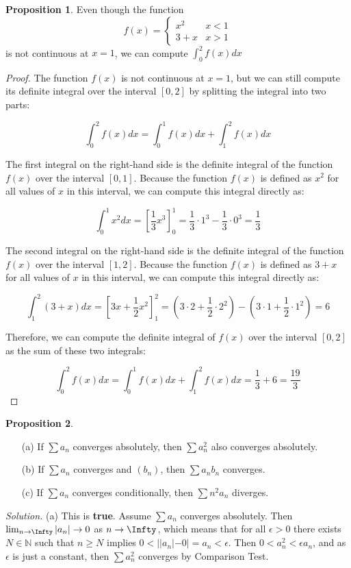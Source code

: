 \documentclass[oneside]{amsart}
\theoremstyle{definition}
\newtheorem{prop}{Proposition}[section]
\newcommand{\nn}{\mathbb N}
\begin{document}
\begin{prop}
Even though the function $$ f(x) = \begin{cases}
	x^2 & x<1 \\
	3+x & x>1
\end{cases}$$	is not continuous at $x =1$, we can compute $\int_0^2 f(x)dx$
\end{prop}
\begin{proof} 
	The function $f(x)$ is not continuous at $x=1$, but we can still compute its definite integral over the interval $[0,2]$ by splitting the integral into two parts:

$$\int_0^2 f(x) dx = \int_0^1 f(x) dx + \int_1^2 f(x) dx$$

The first integral on the right-hand side is the definite integral of the function $f(x)$ over the interval $[0,1]$. Because the function $f(x)$ is defined as $x^2$ for all values of $x$ in this interval, we can compute this integral directly as:

$$\int_0^1 x^2 dx = \left[\frac{1}{3} x^3\right]_0^1 = \frac{1}{3} \cdot 1^3 - \frac{1}{3} \cdot 0^3 = \frac{1}{3}$$

The second integral on the right-hand side is the definite integral of the function $f(x)$ over the interval $[1,2]$. Because the function $f(x)$ is defined as $3+x$ for all values of $x$ in this interval, we can compute this integral directly as:

$$\int_1^2 (3+x) dx = \left[3x+\frac{1}{2} x^2\right]_1^2 = (3 \cdot 2 + \frac{1}{2} \cdot 2^2) - (3 \cdot 1 + \frac{1}{2} \cdot 1^2) = 6$$

Therefore, we can compute the definite integral of $f(x)$ over the interval $[0,2]$ as the sum of these two integrals:

$$\int_0^2 f(x) dx = \int_0^1 f(x) dx + \int_1^2 f(x) dx = \frac{1}{3} + 6 = \boxed{\frac{19}{3}}$$
\end{proof}

\begin{prop}\
\begin{itemize}
	\item [(a)] If $\sum a_n$ converges absolutely, then $\sum a_n^2$ also converges absolutely. 
	\item [(b)] If $\sum a_n$ converges and $(b_n)$, then $\sum a_n b_n$ converges. 
	\item [(c)] If $\sum a_n$ converges conditionally, then $\sum n^2 a_n$ diverges. 
\end{itemize}	
\end{prop}
\textit{Solution.}
(a) This is \textbf{true}. Assume $\sum a_n$ converges absolutely. Then $\lim_{n\to \Infty} |a_n| \to 0$ as $n \to \Infty$, which means that for all $\epsilon > 0$ there exists $N \in \nn$ such that $n \geq N$ implies $0<| |a_n|-0| = a_n < \epsilon$. Then  $ 0 < a_n^2 < \epsilon a_n $, and as $\epsilon$ is just a constant, then $\sum a_n^2$ converges by Comparison Test.
\end{document}
